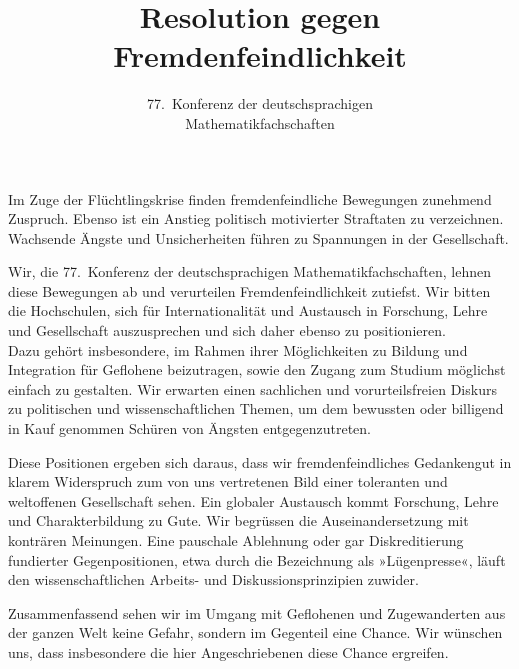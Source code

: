 \documentclass[12pt,a4paper,ngerman,DIV=calc,draft]{scrartcl}
\author{77.~Konferenz der deutschsprachigen \\ Mathematikfachschaften}
\title{Resolution gegen Fremdenfeindlichkeit}
\begin{document}
\maketitle{}


Im Zuge der Flüchtlingskrise finden fremdenfeindliche Bewegungen
zunehmend Zuspruch. Ebenso ist ein Anstieg  politisch
motivierter Straftaten zu verzeichnen. Wachsende Ängste und
Unsicherheiten führen zu Spannungen in der Gesellschaft.

Wir, die 77.~Konferenz der deutschsprachigen Mathematikfachschaften,
lehnen diese Bewegungen ab und verurteilen Fremdenfeindlichkeit
zutiefst. Wir bitten die Hochschulen, sich für Internationalität und
Austausch in Forschung, Lehre und Gesellschaft
auszusprechen und sich daher ebenso zu positionieren. \\
Dazu gehört insbesondere, im Rahmen ihrer Möglichkeiten zu Bildung und
Integration für Geflohene beizutragen, sowie den Zugang zum Studium
möglichst einfach zu gestalten. Wir erwarten einen sachlichen und
vorurteilsfreien Diskurs zu politischen und wissenschaftlichen Themen,
um dem bewussten  oder billigend in Kauf
genommen Schüren von Ängsten entgegenzutreten.

Diese Positionen ergeben sich daraus, dass wir fremdenfeindliches
Gedankengut in klarem Widerspruch zum von uns vertretenen Bild einer
toleranten und weltoffenen Gesellschaft sehen. Ein globaler Austausch
kommt Forschung, Lehre und Charakterbildung zu Gute. Wir begrüssen die
Auseinandersetzung mit konträren Meinungen. Eine pauschale Ablehnung
oder gar Diskreditierung fundierter Gegenpositionen, etwa durch die
Bezeichnung als »Lügenpresse«, läuft den wissenschaftlichen Arbeits-
und Diskussionsprinzipien zuwider.

Zusammenfassend sehen wir im Umgang mit Geflohenen und Zugewanderten
aus der ganzen Welt keine Gefahr, sondern im Gegenteil eine
Chance. Wir wünschen uns, dass insbesondere die hier Angeschriebenen
diese Chance ergreifen.
\end{document}
